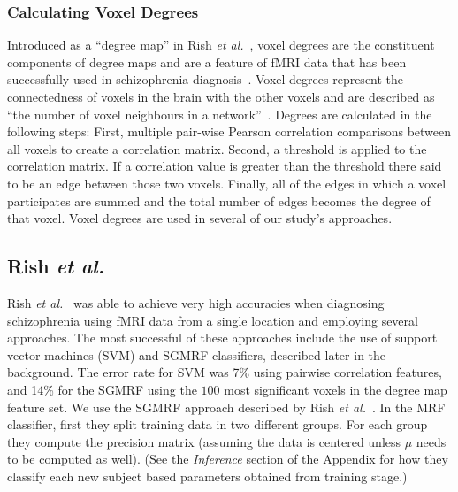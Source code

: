 \documentclass{article} %
\begin{document}
\subsubsection{Calculating Voxel Degrees}
Introduced as a ``degree map'' in Rish 
\emph{et al.}~\cite{rish2009discriminative}, voxel degrees are the constituent
components of degree maps and are a feature of fMRI data that has
been successfully used in schizophrenia diagnosis~\cite{Rish_2013}.
Voxel degrees represent the connectedness of voxels in the brain with the 
other voxels and are described as ``the number of voxel neighbours in a 
network''~\cite{Rish_2013}. Degrees are calculated in the following steps:
First, multiple pair-wise Pearson correlation comparisons between all voxels to 
create a correlation matrix. Second, a threshold is applied to the correlation
matrix. If a correlation value is greater than the threshold there said to be
an edge between those two voxels. Finally, all of the edges in which a voxel
participates are summed and the total number of edges becomes the 
degree of that voxel. Voxel degrees are used in several of our study's 
approaches.

\subsection{Rish \emph{et al.}}
Rish \emph{et al.}~\cite{Rish_2013} was able to achieve very high accuracies 
when diagnosing schizophrenia using fMRI data from a single location and 
employing several approaches. The most successful of these approaches include 
the use of support vector machines (SVM) and SGMRF classifiers, described 
later in the background. The error rate for SVM was 7\% using pairwise 
correlation features, and 14\% for the SGMRF using the $100$ most significant 
voxels in the degree map feature set. We use the SGMRF approach described by 
Rish \emph{et al.}~\cite{Rish_2013}. In the MRF classifier, first they split 
training data in two different groups. For each group they compute the 
precision matrix (assuming the data is centered unless $\mu$ needs to be 
computed as well). (See the \textit{Inference} section of the Appendix for how 
they classify each new subject based parameters obtained from training stage.)

%
\end{document}
